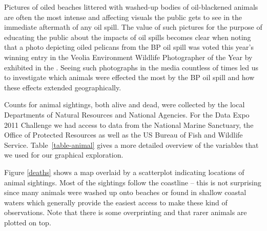 \documentclass[authoryear,12pt]{elsarticle}
\begin{document}
{Pictures of oiled beaches littered with washed-up bodies of oil-blackened animals are often} the most {intense} and {affecting visuals the public gets to see} {in the immediate aftermath of any oil spill}. {The value of such pictures for the purpose of educating the public about the impacts of oil spills becomes clear when noting that a photo depicting oiled pelicans from the BP oil spill was voted} this year's winning entry in the Veolia Environment Wildlife Photographer of the Year by \citet{photo} {exhibited in the \citet{exhibition}}. {Seeing such photographs in the media countless of times led us to investigate which animals were effected the most by the BP oil spill and how these effects extended geographically.}



Counts for animal sightings, both alive and dead, {were} collected by the local Departments of Natural Resources and National Agencies. For the Data Expo 2011 Challenge we had access to data from the National Marine Sanctuary, the Office of Protected Resources as well as the US Bureau of Fish and Wildlife Service. Table~\ref{table-animal} gives a more detailed overview of the variables that we used for our graphical exploration. 

Figure \ref{deaths} shows a map overlaid by a scatterplot indicating locations of animal sightings. Most of the sightings follow the coastline  {-- this} is not surprising since  {many animals were washed up onto beaches or found in shallow coastal waters which generally provide} the easiest access to make these kind of observations. Note that there is some overprinting and that rarer animals are plotted on top. 

%
%
\end{document}
